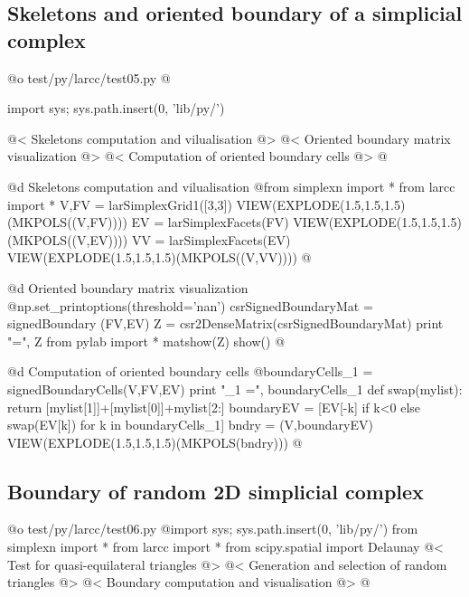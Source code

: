 \documentclass[11pt,oneside]{article}	%
\begin{document}
\subsection{Skeletons and oriented boundary of a simplicial complex}


@o test/py/larcc/test05.py
@{import sys; sys.path.insert(0, 'lib/py/')

@< Skeletons computation and vilualisation @>
@< Oriented boundary matrix visualization @>
@< Computation of oriented boundary cells @>
@}


@d Skeletons computation and vilualisation
@{from simplexn import *
from larcc import *
V,FV = larSimplexGrid1([3,3])
VIEW(EXPLODE(1.5,1.5,1.5)(MKPOLS((V,FV))))
EV = larSimplexFacets(FV)
VIEW(EXPLODE(1.5,1.5,1.5)(MKPOLS((V,EV))))
VV = larSimplexFacets(EV)
VIEW(EXPLODE(1.5,1.5,1.5)(MKPOLS((V,VV))))
@}

@d Oriented boundary matrix visualization
@{np.set_printoptions(threshold='nan')
csrSignedBoundaryMat = signedBoundary (FV,EV)
Z = csr2DenseMatrix(csrSignedBoundaryMat)
print "\ncsrSignedBoundaryMat =\n", Z
from pylab import *
matshow(Z)
show()
@}

@d Computation of oriented boundary cells 
@{boundaryCells_1 = signedBoundaryCells(V,FV,EV)
print "\nboundaryCells_1 =\n", boundaryCells_1
def swap(mylist): return [mylist[1]]+[mylist[0]]+mylist[2:]
boundaryEV = [EV[-k] if k<0 else swap(EV[k]) for k in boundaryCells_1]
bndry = (V,boundaryEV)
VIEW(EXPLODE(1.5,1.5,1.5)(MKPOLS(bndry)))
@}

\subsection{Boundary of random 2D simplicial complex}

@o test/py/larcc/test06.py
@{import sys; sys.path.insert(0, 'lib/py/')
from simplexn import *
from larcc import *
from scipy.spatial import Delaunay
@< Test for quasi-equilateral triangles @>
@< Generation and selection of random triangles @>
@< Boundary computation and visualisation @>
@}
\end{document}
